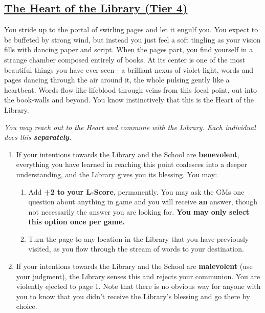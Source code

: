 \documentclass[sheet]{GL2020}
\begin{document}
\clearpage

\begin{center}\section*{\underline{The Heart of the Library (Tier 4)}}\end{center}
\label{HeartoftheLibrary}

You stride up to the portal of swirling pages and let it engulf you. You expect to be buffeted by strong wind, but instead you just feel a soft tingling as your vision fills with dancing paper and script. When the pages part, you find yourself in a strange chamber composed entirely of books. At its center is one of the most beautiful things you have ever seen - a brilliant nexus of violet light, words and pages dancing through the air around it, the whole pulsing gently like a heartbeat. Words flow like lifeblood through veins from this focal point, out into the book-walls and beyond. You know instinctively that this is the Heart of the Library.

\vspace{0.5cm}

\begingroup
\itshape
You may reach out to the Heart and commune with the Library. Each individual does this \textbf{separately}.
\begin{enumerate}[A]
  \item If your intentions towards the Library and the School are \textbf{benevolent}, everything you have learned in reaching this point coalesces into a deeper understanding, and the Library gives you its blessing. You may:
	\begin{enumerate}
		\item Add \textbf{+2 to your L-Score}, permanently. You may ask the GMs one question about anything in game and you will receive \textbf{an} answer, though not necessarily the answer you are looking for. \textbf{You may only select this option once per game.}
		\item Turn the page to any location in the Library that you have previously visited, as you flow through the stream of words to your destination.
	\end{enumerate}
	\item If your intentions towards the Library and the School are \textbf{malevolent} (use your judgment), the Library senses this and rejects your communion. You are violently ejected to page 1. Note that there is no obvious way for anyone with you to know that you didn’t receive the Library's blessing and go there by choice.
\end{enumerate}
\endgroup

\clearpage
\end{document}
